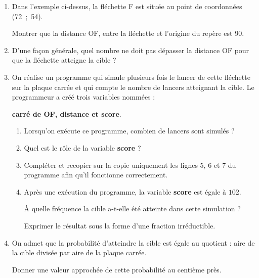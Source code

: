 \begin{enumerate}
\item Dans l'exemple ci-dessus, la fléchette F est située au point de coordonnées (72~;~54).

Montrer que la distance OF, entre la fléchette et l'origine du repère est $90$.
\item D'une façon générale, quel nombre ne doit pas dépasser la distance OF pour que la fléchette atteigne la
cible ?
\item On réalise un programme qui simule plusieurs fois le lancer de cette fléchette sur la plaque carrée et qui compte le nombre de lancers atteignant la cible. Le programmeur a créé trois variables nommées :

\textbf{carré de OF, distance et score}.

\medskip

\begin{scratch}
	{
		{
		}
	}
\end{scratch}

	\begin{enumerate}
		\item Lorsqu'on exécute ce programme, combien de lancers sont simulés ?
		\item Quel est le rôle de la variable \textbf{score} ?
		\item Compléter et recopier sur la copie uniquement les lignes 5, 6 et 7 du programme afin qu'il fonctionne correctement.
		\item Après une exécution du programme, la variable \textbf{score} est égale à $102$. 
		
À quelle fréquence la cible a-t-elle été atteinte dans cette simulation  ?
		
Exprimer le résultat sous la forme d'une fraction irréductible.
	\end{enumerate}
\item  On admet que la probabilité d'atteindre la cible est égale au quotient : aire de la cible divisée par aire de la plaque carrée.
	
Donner une valeur approchée de cette probabilité au centième près.
\end{enumerate}
 
\vspace{0,5cm}

